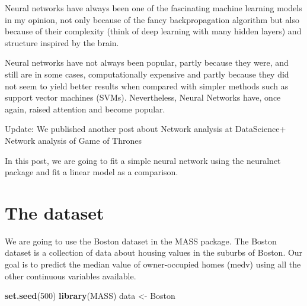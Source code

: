 \documentclass[]{book}
\newenvironment{Shaded}{\begin{snugshade}}{\end{snugshade}}
\newcommand{\DecValTok}[1]{\textcolor[rgb]{0.00,0.00,0.81}{#1}}
\newcommand{\KeywordTok}[1]{\textcolor[rgb]{0.13,0.29,0.53}{\textbf{#1}}}
\newcommand{\NormalTok}[1]{#1}
\newcommand{\StringTok}[1]{\textcolor[rgb]{0.31,0.60,0.02}{#1}}
\begin{document}
Neural networks have always been one of the fascinating machine learning models in my opinion, not only because of the fancy backpropagation algorithm but also because of their complexity (think of deep learning with many hidden layers) and structure inspired by the brain.

Neural networks have not always been popular, partly because they were, and still are in some cases, computationally expensive and partly because they did not seem to yield better results when compared with simpler methods such as support vector machines (SVMs). Nevertheless, Neural Networks have, once again, raised attention and become popular.

Update: We published another post about Network analysis at DataScience+ Network analysis of Game of Thrones

In this post, we are going to fit a simple neural network using the neuralnet package and fit a linear model as a comparison.

\hypertarget{the-dataset}{%
\section{The dataset}\label{the-dataset}}

We are going to use the Boston dataset in the MASS package.
The Boston dataset is a collection of data about housing values in the suburbs of Boston. Our goal is to predict the median value of owner-occupied homes (medv) using all the other continuous variables available.

\begin{Shaded}
\begin{Highlighting}[]
\KeywordTok{set.seed}\NormalTok{(}\DecValTok{500}\NormalTok{)}
\KeywordTok{library}\NormalTok{(MASS)}
\NormalTok{data <-}\StringTok{ }\NormalTok{Boston}
\end{Highlighting}
\end{Shaded}
\end{document}
